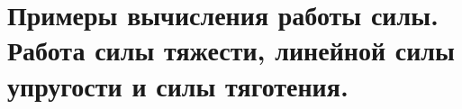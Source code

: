 \chapter{Примеры вычисления работы силы. Работа силы тяжести, линейной силы
упругости и силы тяготения.}

\newpage
